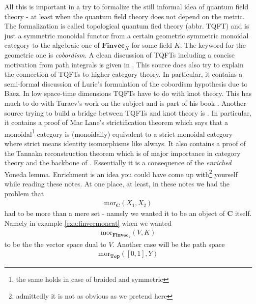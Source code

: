 All this is important in a try to formalize the still informal idea of quantum field theory - at least when the quantum field theory does not depend on the metric. The formalization is called topological quantum fied theory (abbr. TQFT) and is just a symmetric monoidal functor from a certain {\glqq}geometric{\grqq} symmetric monoidal category to the {\glqq}algebraic{\grqq} one of $\mathbf{Finvec}_{K}$ for some field $K$. The keyword for the geometric one is \textit{cobordism}. A clean discussion of TQFTs including a concise motivation from path integrals is given in \cite{00000011}. This source does also try to explain the connection of TQFTs to higher category theory. In particular, it contains a semi-formal discussion of Lurie's formulation of the cobordism hypothesis due to Baez. In low space-time dimensions TQFTs have to do with knot theory. This has much to do with Turaev's work on the subject and is part of his book \cite{24253327}. Another source trying to build a bridge between TQFTs and knot theory is \cite{00000020}. In particular, it contains a proof of Mac Lane's strictification theorem which says that a monoidal\footnote{the same holds in case of braided and symmetric} category is (monoidally) equivalent to a strict monoidal category where strict means identity isomorphisms like always. It also contains a proof of the Tannaka reconstruction theorem which is of major importance in category theory and the backbone of \cite{00000020}. Essentially it is a consequence of the \textit{enriched} Yoneda lemma. {\glqq}Enrichment{\grqq} is an idea you could have come up with\footnote{admittedly it is not as obvious as we pretend here} yourself while reading these notes. At one place, at least, in these notes we had the problem that
\begin{align*}
  \mathrm{mor}_{\mathbf{C}}(X_{1},X_{2})
\end{align*}
had to be more than a mere set - namely we wanted it to be an object of $\mathbf{C}$ itself. Namely in example \ref{exa:finvecmoncat} when we wanted
\begin{align*}
  \mathrm{mor}_{\mathbf{Finvec}_{k}}(V,K)
\end{align*}
to be the the vector space dual to $V$. Another case will be the path space
\begin{align*}
  \mathrm{mor}_{\mathbf{Top}}([0,1],Y)
\end{align*}
